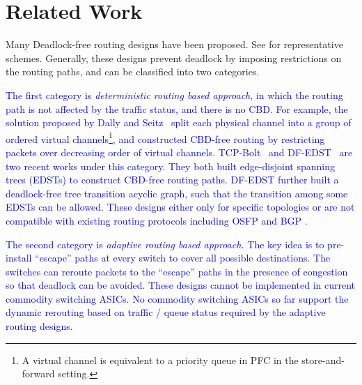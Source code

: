 \section{Related Work}\label{sec:related}

 Many Deadlock-free routing designs have been
proposed. See
\cite{dally,duato93,dally93,sancho2004,flich2012survey,lash,wu2003fault,glass,duato2001,domke2011,puente1999,dfedst16}
for representative schemes. Generally, these designs prevent deadlock by
imposing restrictions on the routing paths, and can be classified into two
categories.

\textcolor{blue}{The first category is {\em deterministic routing based approach}, in which the
routing path is not affected by the traffic status, and there is no CBD. For example, the solution proposed by Dally and Seitz~\cite{dally} split each physical channel  into a group of ordered virtual channels\footnote{A virtual channel is equivalent to a priority queue in PFC in the store-and-forward setting.}, and constructed CBD-free routing by restricting packets over decreasing order of virtual channels.
TCP-Bolt~\cite{tcpbolt} and DF-EDST~\cite{dfedst16} are two recent works under this category. They both built edge-disjoint spanning trees (EDSTs) to construct CBD-free routing paths. DF-EDST further built a deadlock-free tree transition acyclic graph, such that the transition among some EDSTs can be allowed. These designs either only for specific topologies \cite{dally} or are not compatible with existing routing protocols including OSFP and BGP \cite{tcpbolt,dfedst16}.}

\textcolor{blue}{The second category is {\em adaptive routing based approach.} The key idea is to pre-install  ``escape'' paths at every switch to cover all possible
destinations. The switches can reroute packets to the ``escape'' paths in the
presence of congestion so that deadlock can be avoided. These designs cannot be implemented in current commodity switching ASICs. No commodity switching ASICs so far support the dynamic rerouting based on traffic / queue status required by the adaptive routing designs.}



